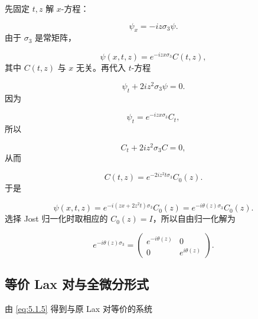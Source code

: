 \documentclass[
    lang=cn,
    scheme=chinese,
    mode=simple,
    device=normal,
    color=blue,
    math=cm,
    thmcnt=section,
    12pt
]{elegantbook}
\begin{document}
\begin{callout}[计算：这个自由基本解是怎样求出来的？]
    先固定 $t,z$ 解 $x$-方程：

    \[
        \psi_x=-iz\sigma_3\psi.
    \]
    由于 $\sigma_3$ 是常矩阵，

    \[
        \psi(x,t,z)
        =
        e^{-izx\sigma_3}C(t,z),
    \]
    其中 $C(t,z)$ 与 $x$ 无关。再代入 $t$-方程

    \[
        \psi_t+2iz^2\sigma_3\psi=0.
    \]
    因为

    \[
        \psi_t=e^{-izx\sigma_3}C_t,
    \]
    所以

    \[
        C_t+2iz^2\sigma_3C=0,
    \]
    从而

    \[
        C(t,z)
        =
        e^{-2iz^2t\sigma_3}C_0(z).
    \]
    于是

    \[
        \psi(x,t,z)
        =
        e^{-i(zx+2z^2t)\sigma_3}C_0(z)
        =
        e^{-i\theta(z)\sigma_3}C_0(z).
    \]
    选择 Jost 归一化时取相应的 $C_0(z)=I$，所以自由归一化解为

    \[
        e^{-i\theta(z)\sigma_3}
        =
        \begin{pmatrix}
            e^{-i\theta(z)} & 0              \\
            0               & e^{i\theta(z)}
        \end{pmatrix}.
    \]

\end{callout}




\subsection{等价 Lax 对与全微分形式}

由 \eqref{eq:5.1.5} 得到与原 Lax 对等价的系统
\end{document}
